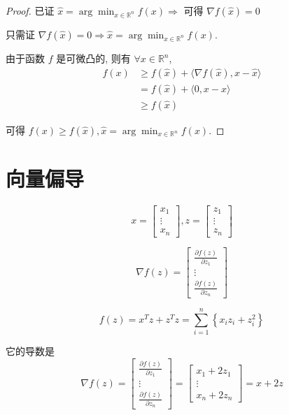 \begin{proof}
    已证 $ \hat{x}=\arg \min _{x \in \mathbb{R}^{n}} f(x) \Rightarrow $ 可得 $ \nabla f(\hat{x})=0 $

    只需证 $ \nabla f(\hat{x})=0 \Rightarrow \hat{x}=\arg \min _{x \in \mathbb{R}^{n}} f(x) $.

    由于函数 $ f $ 是可微凸的, 则有 $ \forall x \in \mathbb{R}^{n} $,
$$
\begin{aligned}
f(x) & \geq f(\hat{x})+\langle\nabla f(\hat{x}), x-\hat{x}\rangle \\
& = f(\hat{x})+\langle 0, x-\hat{x}\rangle 
\\ & \geq f(\hat{x})
\end{aligned}
$$

可得 $ f(x) \geq f(\hat{x}), \hat{x}=\arg \min _{x \in \mathbb{R}^{n}} f(x) $.
\end{proof}

\section{向量偏导}

\begin{definition}[向量对向量的导数]
    \label{Definition:VectorVectorDerivative}
    $$ x=\left[\begin{array}{c}x_{1} \\ \vdots \\ x_{n}\end{array}\right], z=\left[\begin{array}{c}z_{1} \\ \vdots \\ z_{n}\end{array}\right] $$

    $$ \nabla f(z)=\left[\begin{array}{c}\frac{\partial f(z)}{\partial z_{1}} \\ \vdots \\ \frac{\partial f(z)}{\partial z_{n}}\end{array}\right] $$
\end{definition}

\begin{example}
    $$ f(z)=x^{T} z+z^{T} z=\sum_{i=1}^{n}\left\{x_{i} z_{i}+z_{i}^{2}\right\} $$

    它的导数是
    $$ \nabla f(z)=\left[\begin{array}{c}\frac{\partial f(z)}{\partial z_{1}} \\ \vdots \\ \frac{\partial f(z)}{\partial z_{n}}\end{array}\right]=\left[\begin{array}{c}x_{1}+2 z_{1} \\ \vdots \\ x_{n}+2 z_{n}\end{array}\right]=x+2 z $$
\end{example}


